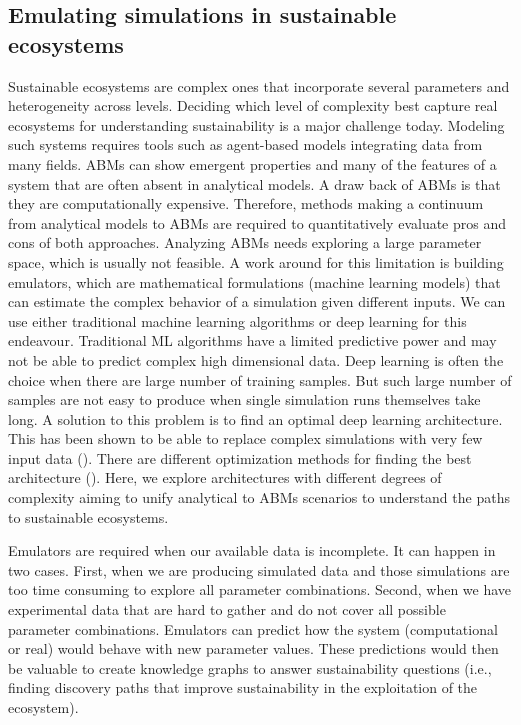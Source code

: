 \documentclass[12pt,a4paper]{article}
\begin{document}
\subsection{Emulating simulations in sustainable ecosystems}

Sustainable ecosystems are complex ones that incorporate several parameters and heterogeneity across levels. Deciding which level of complexity best capture real ecosystems for understanding sustainability is a major challenge today. Modeling such systems requires tools such as agent-based models integrating data from many fields. ABMs can show emergent properties and many of the features of a system that are often absent in analytical models. A draw back of ABMs is that they are computationally expensive. Therefore, methods making a continuum from analytical models to ABMs are required to quantitatively evaluate pros and cons of both approaches. Analyzing ABMs needs exploring a large parameter space, which is usually not feasible. A work around for this limitation is building emulators, which are mathematical formulations (machine learning models) that can estimate the complex behavior of a simulation given different inputs. We can use either traditional machine learning algorithms or deep learning for this endeavour. Traditional ML algorithms have a limited predictive power and may not be able to predict complex high dimensional data. Deep learning is often the choice when there are large number of training samples. But such large number of samples are not easy to produce when single simulation runs themselves take long. A solution to this problem is to find an optimal deep learning architecture. This has been shown to be able to replace complex simulations with very few input data (\cite{Kasim2020}). There are different optimization methods for finding the best architecture (\cite{Elsken2018}). Here, we explore architectures with different degrees of complexity aiming to unify analytical to ABMs scenarios to understand the paths to sustainable ecosystems. 

Emulators are required when our available data is incomplete. It can happen in two cases. First, when we are producing simulated data and those simulations are too time consuming to explore all parameter combinations. Second, when we have experimental data that are hard to gather and do not cover all possible parameter combinations. Emulators can predict how the system (computational or real) would behave with new parameter values. These predictions would then be valuable to create knowledge graphs to answer sustainability questions (i.e., finding discovery paths that improve sustainability in the exploitation of the ecosystem).
\end{document}
